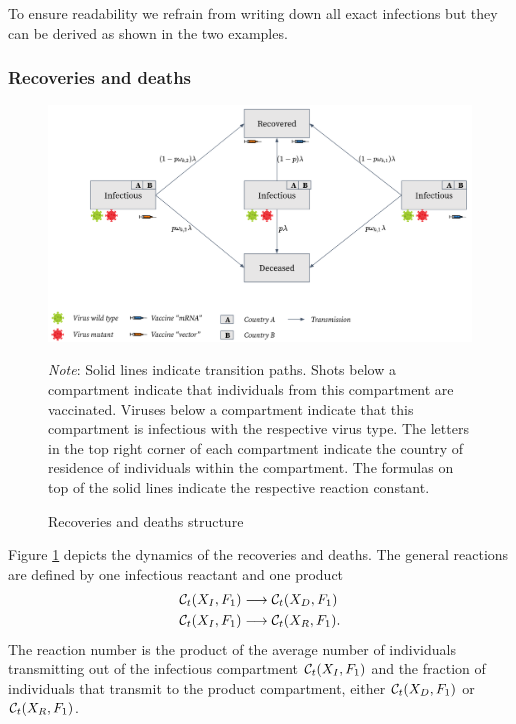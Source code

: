 To ensure readability we refrain from writing down all exact infections but they can be derived as shown in the two examples.

\subsubsection{Recoveries and deaths}
\begin{figure}[h!]
\centering
\includegraphics[scale=0.3]{images/overview_recovery.png}\\
\begin{flushleft}
\scriptsize{\textit{Note}: Solid lines indicate transition paths. Shots below a compartment indicate that individuals from this compartment are vaccinated. Viruses below a compartment indicate that this compartment is infectious with the respective virus type. The letters in the top right corner of each compartment indicate the country of residence of individuals within the compartment. The formulas on top of the solid lines indicate the respective reaction constant.}
\end{flushleft}
\caption{Recoveries and deaths structure}
\label{fig:model_recoveries}
\end{figure}
Figure \ref{fig:model_recoveries} depicts the dynamics of the recoveries and deaths. The general reactions are defined by one infectious reactant and one product
\begin{align}
\label{eq:recovery}
    \mathcal{C}_t(X_I, F_1) & \longrightarrow  \mathcal{C}_t(X_D, F_1) \\
    \mathcal{C}_t(X_I, F_1) & \longrightarrow  \mathcal{C}_t(X_R, F_1). \notag
\end{align}
The reaction number is the product of the average number of individuals transmitting out of the infectious compartment $\mathcal{C}_t(X_I, F_1)$ and the fraction of individuals that transmit to the product compartment, either $\mathcal{C}_t(X_D, F_1)$ or $\mathcal{C}_t(X_R, F_1)$. \\

